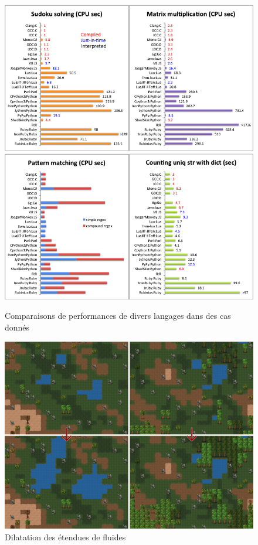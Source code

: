 \documentclass[a4paper]{memoir}
\begin{document}
			\begin{figure}[H]
				\begin{center}
					\includegraphics[scale=0.5]{img/AnalyseLangage1.png}
					\includegraphics[scale=0.5]{img/AnalyseLangage2.png} 
				\end{center}
				\label{fig:analyse}
				\caption{Comparaisons de performances de divers langages dans des cas donnés}
			\end{figure}
			
			\begin{figure}[H]
				\begin{center}
					\includegraphics[scale=0.2]{img/Dilate.png}
				\end{center}
				\label{fig:incidenceDeb}
				\caption{Dilatation des étendues de fluides}
			\end{figure}
			
\end{document}
